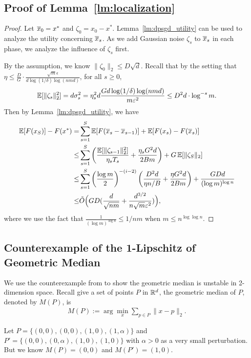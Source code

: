 \subsection{Proof of Lemma~\ref{lm:localization}}
\Localization*
\begin{proof}
Let $\overline{x}_0=x^*$ and $\zeta_0=x_0-x^*$.
Lemma~\ref{lm:dpsgd_utility} can be used to analyze the utility concerning $\overline{x}_s$.
As we add Gaussian noise $\zeta_s$ to $\overline{x}_s$ in each phase, we analyze the influence of $\zeta_s$ first.

By the assumption, we know $\|\zeta_0\|_2\le D\sqrt{d}$.
Recall that by the setting that $\eta\le \frac{D}{G}\cdot\frac{\sqrt{m}\epsilon}{d\log(1/\delta)\log(nmd)}$, for all $s\ge 0$,
\begin{align*}
\operatorname*{\mathbb{E}}[\|\zeta_s\|_2^2]=d\sigma_s^2=\eta_s^2d\frac{Gd\log(1/\delta)\log(nmd)}{m\varepsilon^2}\le D^2d\cdot \log^{-s}m.
\end{align*}
Then by Lemma~\ref{lm:dpsgd_utility}, we have
\begin{align*}
    \operatorname*{\mathbb{E}}[F(x_S)]-F(x^*)=&\sum_{s=1}^{S}\operatorname*{\mathbb{E}}[F(\overline{x}_{s}-\overline{x}_{s-1})]+\operatorname*{\mathbb{E}}[F(x_s)-F(\overline{x}_s)]\\
    \le & \sum_{s=1}^{S} \left(\frac{\operatorname*{\mathbb{E}}[\|\zeta_{s-1}\|_2^2]}{\eta_sT_s}+\frac{\eta_sG^2d}{2Bm} \right)+G\operatorname*{\mathbb{E}}[\|\zeta_S\|_2]\\
    \le& \sum_{s=1}^{S} \left(\frac{\log m}{2} \right)^{-(i-2)}\left(\frac{D^2d}{\eta n/B}+\frac{\eta G^2d}{2Bm} \right)+\frac{GDd}{(\log m)^{\log n}}\\
    \le & \Tilde{O} \Big( GD(\frac{d}{\sqrt{nm}}+\frac{d^{3/2}}{n\sqrt{m}\varepsilon^2})\Big),
\end{align*}
where we use the fact that $\frac{1}{(\log m)^{\log n}}\le 1/nm$ when $m\le n^{\log \log n}$.
\end{proof}

\subsection{Counterexample of the 1-Lipschitz of Geometric Median}
\label{sec:counter_example}
We use the counterexample from \cite{durocher2009projection} to show the geometric median is unstable in 2-dimension space.
Recall give a set of points $P$ in $\mathbb{R}^d$, the geometric median of $P$, denoted by $M(P)$, is
\begin{align*}
    M(P):=\arg\min_{x}\sum_{p\in P}\|x- p\|_2.
\end{align*}

Let $P=\{(0,0),(0,0),(1,0),(1,\alpha)\}$ and $P'=\{(0,0),(0,\alpha),(1,0),(1,0)\}$ with $\alpha>0$ as a very small perturbation.
But we know $M(P)=(0,0)$ and $M(P')=(1,0)$.